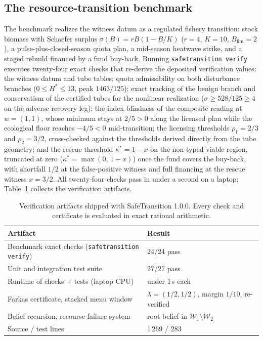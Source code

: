 \documentclass[3p,11pt]{elsarticle}
\begin{document}
\subsection{The resource-transition benchmark}\label{sec:benchmark}

The benchmark realizes the witness datum as a regulated fishery transition:
stock biomass with Schaefer surplus $\sigma(B) = rB(1 - B/K)$ ($r = 4$,
$K = 10$, $B_{\mathrm{lim}} = 2$), a pulse-plus-closed-season quota plan,
a mid-season heatwave strike, and a staged rebuild financed by a fund
buy-back. Running \texttt{safetransition verify} executes twenty-four exact
checks that re-derive the deposited verification values: the witness datum
and tube tables; quota admissibility on both disturbance branches
($0 \leq H^* \leq 13$, peak $1463/125$); exact tracking of the benign
branch and conservatism of the certified tubes for the nonlinear
realization ($\sigma \geq 528/125 \geq 4$ on the adverse recovery leg); the
index blindness of the composite reading at $w = (1, 1)$, whose minimum
stays at $2/5 > 0$ along the licensed plan while the ecological floor
reaches $-4/5 < 0$ mid-transition; the licensing thresholds
$\rho_1 = 2/3$ and $\rho_2 = 3/2$, cross-checked against the thresholds
derived directly from the tube geometry; and the rescue threshold
$\kappa^* = 1 - x$ on the non-typed-viable region, truncated at zero
($\kappa^* = \max(0,\, 1-x)$) once the fund covers the buy-back, with
shortfall $1/2$ at the false-positive witness and full financing at the
rescue witness $x = 3/2$. All twenty-four checks pass in under a second on a laptop;
Table~\ref{tab:qa} collects the verification artifacts.

\begin{table}[t]
\centering
\small
\begin{tabular}{@{}ll@{}}
\toprule
Artifact & Result \\
\midrule
Benchmark exact checks (\texttt{safetransition verify}) & 24/24 pass \\
Unit and integration test suite & 27/27 pass \\
Runtime of checks + tests (laptop CPU) & under 1\,s each \\
Farkas certificate, stacked menu window & $\lambda = (1/2, 1/2)$, margin
$1/10$, re-verified \\
Belief recursion, recourse-failure system & root belief in
$\mathcal{W}_1 \setminus \mathcal{W}_2$ \\
Source / test lines & 1\,269 / 283 \\
\bottomrule
\end{tabular}
\caption{Verification artifacts shipped with SafeTransition 1.0.0. Every
check and certificate is evaluated in exact rational arithmetic.}
\label{tab:qa}
\end{table}
\end{document}
